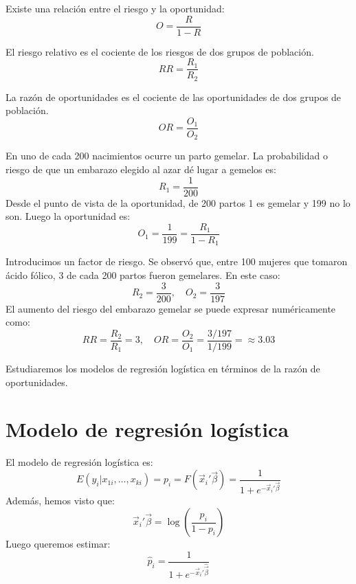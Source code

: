 \begin{remark}
    Existe una relación entre el riesgo y la oportunidad:
    $$O = \frac{R}{1-R}$$
\end{remark}

\begin{definition}
    El riesgo relativo es el cociente de los riesgos de dos grupos de población.
    $$RR = \frac{R_1}{R_2}$$
\end{definition}

\begin{definition}
    La razón de oportunidades es el cociente de las oportunidades de dos grupos de población.
    $$OR = \frac{O_1}{O_2}$$
\end{definition}

\begin{example}
    En uno de cada 200 nacimientos ocurre un parto gemelar.
    La probabilidad o riesgo de que un embarazo elegido al azar dé lugar a gemelos es:
    $$R_1 = \frac{1}{200}$$
    Desde el punto de vista de la oportunidad, de 200 partos 1 es gemelar y 199 no lo son.
    Luego la oportunidad es:
    $$O_1 = \frac{1}{199} = \frac{R_1}{1-R_1}$$

    Introducimos un factor de riesgo.
    Se observó que, entre 100 mujeres que tomaron ácido fólico, 3 de cada 200 partos fueron gemelares.
    En este caso:
    $$R_2 = \frac{3}{200}, \quad O_2 = \frac{3}{197}$$
    El aumento del riesgo del embarazo gemelar se puede expresar numéricamente como:
    $$RR = \frac{R_2}{R_1} = 3, \quad OR = \frac{O_2}{O_1} = \frac{3/197}{1/199} = \approx 3.03$$

    Estudiaremos los modelos de regresión logística en términos de la razón de oportunidades.
\end{example}

\section{Modelo de regresión logística}
El modelo de regresión logística es:
$$E(y_i | x_{1i}, \dots, x_{ki}) = p_i = F(\vec{x}_i'\vec{\beta}) = \frac{1}{1 + e^{-\vec{x}_i'\vec{\beta}}}$$
Además, hemos visto que:
$$\vec{x}_i'\vec{\beta} = \log\left(\frac{p_i}{1-p_i}\right)$$
Luego queremos estimar:
$$\hat{p}_i = \frac{1}{1 + e^{-\vec{x}_i'\hat{\vec{\beta}}}}$$

